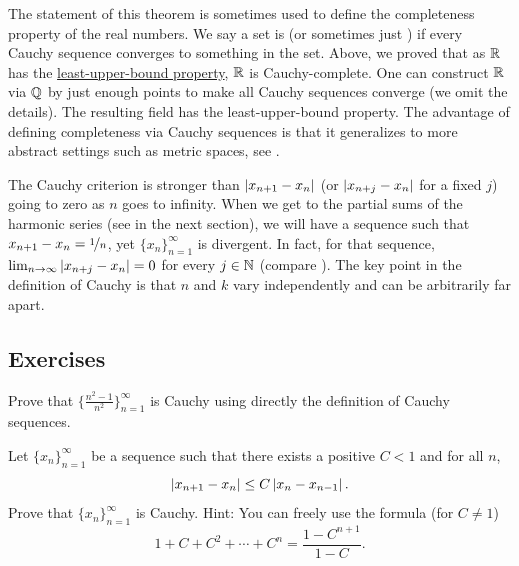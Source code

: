 \begin{remark}
The statement of this theorem is sometimes used to define the
completeness property of the real numbers.  We say a set is
\emph{} (or sometimes just \emph{})
if every Cauchy sequence converges to something in the set.
Above, we proved that
as ${\mathbb{R}}$ has the \hyperref[defn:lub]{least-upper-bound property}, ${\mathbb{R}}$ is 
Cauchy-complete.
One can construct ${\mathbb{R}}$ via
 ${\mathbb{Q}}$ by  just enough points to make all
Cauchy sequences converge (we omit the details).
The resulting field has the
least-upper-bound property.
The advantage of defining completeness via Cauchy
sequences is that it generalizes to
more abstract settings such as metric spaces, see .
\end{remark}

The Cauchy criterion is stronger than 
$\left\lvert {x_{n+1}-x_n} \right\rvert$ (or $\left\lvert {x_{n+j}-x_n} \right\rvert$ for a fixed $j$) going to zero as
$n$ goes to
infinity.  When we get to the partial sums of the harmonic series
(see  in the next section), we will have
a sequence such that $x_{n+1}-x_n = \nicefrac{1}{n}$,
yet $\{ x_n \}_{n=1}^\infty$ is divergent.
In fact, for that sequence,
$\lim_{n\to\infty} \left\lvert {x_{n+j}-x_n} \right\rvert = 0$ for
every $j \in {\mathbb{N}}$ (compare ).
The key point in the definition of Cauchy is that $n$ and $k$
vary independently and can be arbitrarily far apart.

\subsection{Exercises}

\begin{exercise}
Prove that $\bigl\{ \frac{n^2-1}{n^2} \bigr\}_{n=1}^\infty$ is Cauchy using directly the definition
of Cauchy sequences.
\end{exercise}

\begin{exercise}
Let $\{ x_n \}_{n=1}^\infty$ be a sequence such that
there exists a positive $C < 1$ and for all $n$,
\begin{equation*}
\left\lvert {x_{n+1} - x_n} \right\rvert \leq C \left\lvert {x_{n}-x_{n-1}} \right\rvert .
\end{equation*}
Prove that $\{ x_n \}_{n=1}^\infty$ is Cauchy.
Hint:  You can freely use the formula (for $C \not= 1$)
\begin{equation*}
1+ C+ C^2 + \cdots + C^n = \frac{1-C^{n+1}}{1-C}.
\end{equation*}
\end{exercise}


